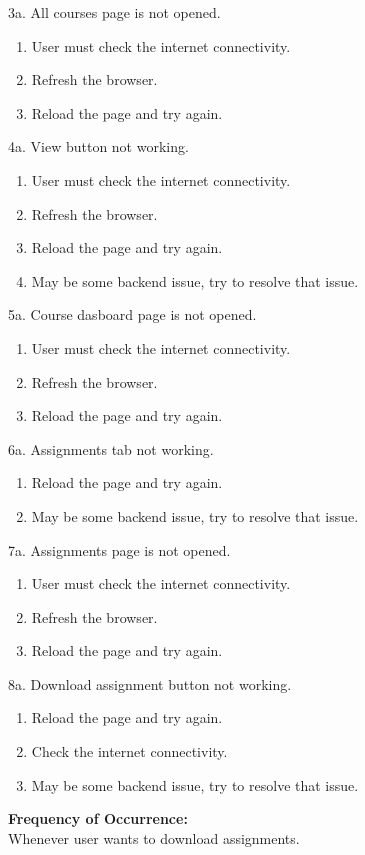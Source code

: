 \documentclass[12pt]{article}
\begin{document}
3a. All courses page is not opened.
\begin{enumerate}
\item User must check the internet connectivity.
\item Refresh the browser.
\item Reload the page and try again.
\end{enumerate}
4a. View button not working.
\begin{enumerate}
\item User must check the internet connectivity.
\item Refresh the browser.
\item Reload the page and try again.
\item May be some backend issue, try to resolve that issue.
\end{enumerate}
5a. Course dasboard page is not opened.
\begin{enumerate}
\item User must check the internet connectivity.
\item Refresh the browser.
\item Reload the page and try again.
\end{enumerate}
6a. Assignments tab not working.
\begin{enumerate}
\item Reload the page and try again.
\item May be some backend issue, try to resolve that issue.
\end{enumerate}
7a. Assignments page is not opened.
\begin{enumerate}
\item User must check the internet connectivity.
\item Refresh the browser.
\item Reload the page and try again.
\end{enumerate}
8a. Download assignment button not working.
\begin{enumerate}
\item Reload the page and try again.
\item Check the internet connectivity.
\item May be some backend issue, try to resolve that issue.
\end{enumerate}
\textbf{Frequency of Occurrence:}\\
Whenever user wants to download assignments.
\end{document}
